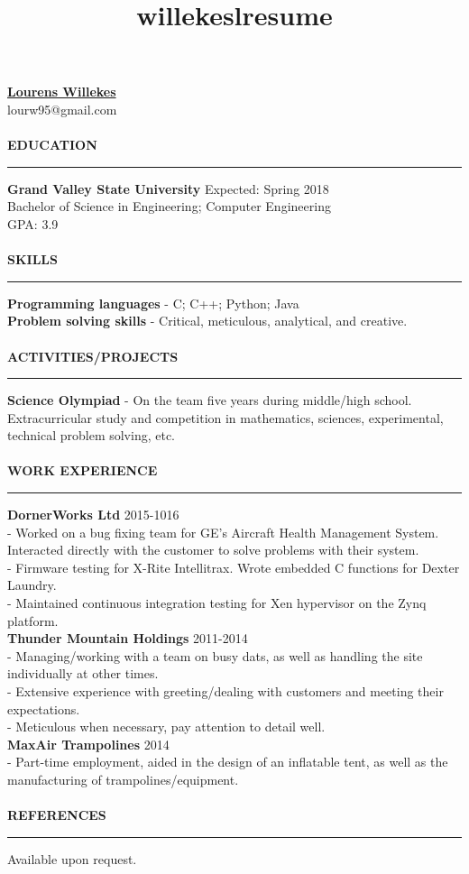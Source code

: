 \documentclass[12pt]{article}
\title{willekeslresume}
\begin{document}
{\noindent
	{\large{\underline{\textbf{Lourens Willekes}}}} \\
    lourw95@gmail.com \\
     \quad \\
    \textbf{EDUCATION} \\
    \rule{21cm}{0.4pt}
    \textbf{Grand Valley State University} Expected: Spring 2018 \\
    Bachelor of Science in Engineering; Computer Engineering \\
    GPA: 3.9 \\
    \\
    \textbf{SKILLS} \\
    \rule{21cm}{0.4pt}
    \textbf{Programming languages} - C; C++; Python; Java \\
    \textbf{Problem solving skills} - Critical, meticulous, analytical, and creative. \\
    \\
    \textbf{ACTIVITIES/PROJECTS} \\
    \rule{21cm}{0.4pt}
    \textbf{Science Olympiad} - On the team five years during middle/high school. Extracurricular study and competition in mathematics, sciences, experimental, technical problem solving, etc. \\
    \\
    \textbf{WORK EXPERIENCE} \\
    \rule{21cm}{0.4pt}
    \textbf{DornerWorks Ltd} 2015-1016 \\
     - Worked on a bug fixing team for GE's Aircraft Health Management System. Interacted directly with the customer to solve problems with their system. \\
     - Firmware testing for X-Rite Intellitrax. Wrote embedded C functions for Dexter Laundry. \\
     - Maintained continuous integration testing for Xen hypervisor on the Zynq platform. \\
     \textbf{Thunder Mountain Holdings} 2011-2014 \\
     - Managing/working with a team on busy dats, as well as handling the site individually at other times. \\
     - Extensive experience with greeting/dealing with customers and meeting their expectations. \\
     - Meticulous when necessary, pay attention to detail well. \\
     \textbf{MaxAir Trampolines} 2014 \\
     - Part-time employment, aided in the design of an inflatable tent, as well as the manufacturing of trampolines/equipment. \\
     \\
     \textbf{REFERENCES} \\
     \rule{21cm}{0.4pt}
     Available upon request. \\
      
}

{\noindent}
\end{document}
